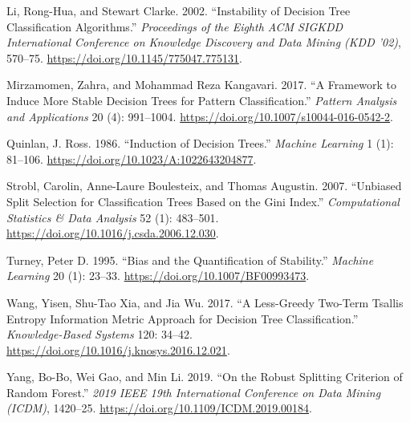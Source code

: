 \documentclass[
  conference]{IEEEtran}
\newlength{\cslhangindent}
\newenvironment{CSLReferences}[2] %
 {\begin{list}{}{%
  \setlength{\itemindent}{0pt}
  \setlength{\leftmargin}{0pt}
  \setlength{\parsep}{0pt}
  \ifodd #1
   \setlength{\leftmargin}{\cslhangindent}
   \setlength{\itemindent}{-1\cslhangindent}
  \fi
  \setlength{\itemsep}{#2\baselineskip}}}
 {\end{list}}
\begin{document}
\begin{CSLReferences}{1}{1}
Li, Rong-Hua, and Stewart Clarke. 2002. {``Instability of Decision Tree
Classification Algorithms.''} \emph{Proceedings of the Eighth ACM SIGKDD
International Conference on Knowledge Discovery and Data Mining (KDD
'02)}, 570--75. \url{https://doi.org/10.1145/775047.775131}.

Mirzamomen, Zahra, and Mohammad Reza Kangavari. 2017. {``A Framework to
Induce More Stable Decision Trees for Pattern Classification.''}
\emph{Pattern Analysis and Applications} 20 (4): 991--1004.
\url{https://doi.org/10.1007/s10044-016-0542-2}.

Quinlan, J. Ross. 1986. {``Induction of Decision Trees.''} \emph{Machine
Learning} 1 (1): 81--106. \url{https://doi.org/10.1023/A:1022643204877}.

Strobl, Carolin, Anne-Laure Boulesteix, and Thomas Augustin. 2007.
{``Unbiased Split Selection for Classification Trees Based on the {G}ini
Index.''} \emph{Computational Statistics \& Data Analysis} 52 (1):
483--501. \url{https://doi.org/10.1016/j.csda.2006.12.030}.

Turney, Peter D. 1995. {``Bias and the Quantification of Stability.''}
\emph{Machine Learning} 20 (1): 23--33.
\url{https://doi.org/10.1007/BF00993473}.

Wang, Yisen, Shu-Tao Xia, and Jia Wu. 2017. {``A Less-Greedy Two-Term
Tsallis Entropy Information Metric Approach for Decision Tree
Classification.''} \emph{Knowledge-Based Systems} 120: 34--42.
\url{https://doi.org/10.1016/j.knosys.2016.12.021}.

Yang, Bo-Bo, Wei Gao, and Min Li. 2019. {``On the Robust Splitting
Criterion of Random Forest.''} \emph{2019 IEEE 19th International
Conference on Data Mining (ICDM)}, 1420--25.
\url{https://doi.org/10.1109/ICDM.2019.00184}.

\end{CSLReferences}
\end{document}
